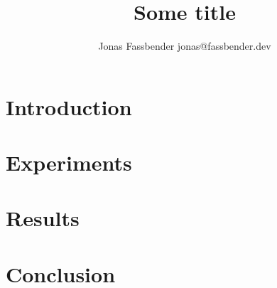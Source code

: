\documentclass[twoside,11pt]{article}
\title{Some title}
\author{\name Jonas Fassbender
        \email jonas@fassbender.dev}
\begin{document}
\maketitle

\begin{abstract}
\end{abstract}

\begin{keywords}
\end{keywords}

\section{Introduction}

\begin{center}





\end{center}

\section{Experiments}

\section{Results}

\section{Conclusion}
\end{document}
